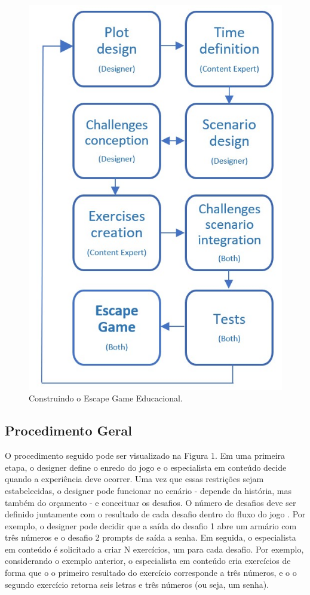\begin{figure}
    \centering
    \includegraphics[width=.9\textwidth]{chaps/Images/Esquema Escape(1).jpg}
    \caption{Construindo o Escape Game Educacional.}
    \label{fig:esquema_escape}
\end{figure}

\subsection{Procedimento Geral}

O procedimento seguido pode ser visualizado na Figura 1. Em uma primeira etapa, o designer define o enredo do jogo e o especialista em conteúdo decide quando a experiência deve ocorrer. Uma vez que essas restrições sejam estabelecidas, o designer pode funcionar no cenário - depende da história, mas também do orçamento - e conceituar os desafios. O número de desafios deve ser definido juntamente com o resultado de cada desafio dentro do fluxo do jogo \citep{csikszentmihalyi_creativity_1996}. Por exemplo, o designer pode decidir que a saída do desafio 1 abre um armário com três números e o desafio 2 prompts de saída a senha. Em seguida, o especialista em conteúdo é solicitado a criar N exercícios, um para cada desafio. Por exemplo, considerando o exemplo anterior, o especialista em conteúdo cria exercícios de forma que o o primeiro resultado do exercício corresponde a três números, e o o segundo exercício retorna seis letras e três números (ou seja, um senha).

